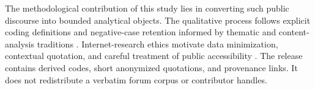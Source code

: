 The methodological contribution of this study lies in converting such public discourse into bounded analytical objects. The qualitative process follows explicit coding definitions and negative-case retention informed by thematic and content-analysis traditions \cite{braun2006thematic,krippendorff2018content}. Internet-research ethics motivate data minimization, contextual quotation, and careful treatment of public accessibility \cite{aoir2019ethics}. The release contains derived codes, short anonymized quotations, and provenance links. It does not redistribute a verbatim forum corpus or contributor handles.
